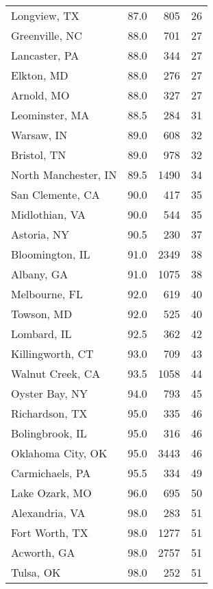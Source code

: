 \begin{longtable}{lrrr}
Longview, TX         &    87.0 &    805 &    26 \\
Greenville, NC       &    88.0 &    701 &    27 \\
Lancaster, PA        &    88.0 &    344 &    27 \\
Elkton, MD           &    88.0 &    276 &    27 \\
Arnold, MO           &    88.0 &    327 &    27 \\
Leominster, MA       &    88.5 &    284 &    31 \\
Warsaw, IN           &    89.0 &    608 &    32 \\
Bristol, TN          &    89.0 &    978 &    32 \\
North Manchester, IN &    89.5 &   1490 &    34 \\
San Clemente, CA     &    90.0 &    417 &    35 \\
Midlothian, VA       &    90.0 &    544 &    35 \\
Astoria, NY          &    90.5 &    230 &    37 \\
Bloomington, IL      &    91.0 &   2349 &    38 \\
Albany, GA           &    91.0 &   1075 &    38 \\
Melbourne, FL        &    92.0 &    619 &    40 \\
Towson, MD           &    92.0 &    525 &    40 \\
Lombard, IL          &    92.5 &    362 &    42 \\
Killingworth, CT     &    93.0 &    709 &    43 \\
Walnut Creek, CA     &    93.5 &   1058 &    44 \\
Oyster Bay, NY       &    94.0 &    793 &    45 \\
Richardson, TX       &    95.0 &    335 &    46 \\
Bolingbrook, IL      &    95.0 &    316 &    46 \\
Oklahoma City, OK    &    95.0 &   3443 &    46 \\
Carmichaels, PA      &    95.5 &    334 &    49 \\
Lake Ozark, MO       &    96.0 &    695 &    50 \\
Alexandria, VA       &    98.0 &    283 &    51 \\
Fort Worth, TX       &    98.0 &   1277 &    51 \\
Acworth, GA          &    98.0 &   2757 &    51 \\
Tulsa, OK            &    98.0 &    252 &    51 \\

\end{longtable}
